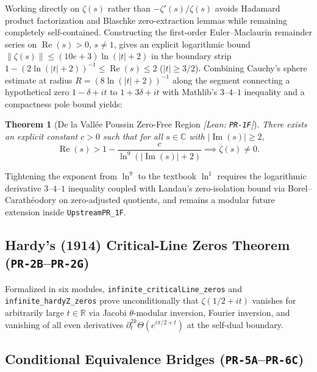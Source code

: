 \documentclass[11pt,a4paper]{article}
\newtheorem{theorem}{Theorem}[section]
\theoremstyle{definition}
\newcommand{\Rset}{\mathbb{R}}
\newcommand{\Cfield}{\mathbb{C}}
\begin{document}
Working directly on $\zeta(s)$ rather than $-\zeta'(s)/\zeta(s)$ avoids Hadamard product factorization and Blaschke zero-extraction lemmas while remaining completely self-contained. Constructing the first-order Euler--Maclaurin remainder series on $\operatorname{Re}(s) > 0$, $s \neq 1$, gives an explicit logarithmic bound $\|\zeta(s)\| \le (10e + 3)\ln(|t| + 2)$ in the boundary strip $1 - (2\ln(|t|+2))^{-1} \le \operatorname{Re}(s) \le 2$ ($|t| \ge 3/2$). Combining Cauchy's sphere estimate at radius $R = (8\ln(|t|+2))^{-1}$ along the segment connecting a hypothetical zero $1 - \delta + it$ to $1 + 3\delta + it$ with Mathlib's $3$--$4$--$1$ inequality and a compactness pole bound yields:

\begin{theorem}[De la Vall\'ee Poussin Zero-Free Region \emph{[Lean: \texttt{PR-1F}]}]
There exists an explicit constant $c > 0$ such that for all $s \in \Cfield$ with $|{\operatorname{Im}(s)}| \ge 2$,
\[
  \operatorname{Re}(s) > 1 - \frac{c}{\ln^9(|{\operatorname{Im}(s)}| + 2)} \implies \zeta(s) \neq 0.
\]
\end{theorem}

\noindent Tightening the exponent from $\ln^9$ to the textbook $\ln^1$ requires the logarithmic derivative $3$--$4$--$1$ inequality coupled with Landau's zero-isolation bound via Borel--Carath\'eodory on zero-adjusted quotients, and remains a modular future extension inside \texttt{UpstreamPR\_1F}.

\subsection{Hardy's (1914) Critical-Line Zeros Theorem (\texttt{PR-2B}--\texttt{PR-2G})}

Formalized in six modules, \texttt{infinite\_\allowbreak criticalLine\_\allowbreak zeros} and \texttt{infinite\_\allowbreak hardyZ\_\allowbreak zeros} prove unconditionally that $\zeta(1/2 + it)$ vanishes for arbitrarily large $t \in \Rset$ via Jacobi $\theta$-modular inversion, Fourier inversion, and vanishing of all even derivatives $\partial_t^{2k} \Theta(e^{i\pi/2 + t})$ at the self-dual boundary.

\subsection{Conditional Equivalence Bridges (\texttt{PR-5A}--\texttt{PR-6C})}
\end{document}
